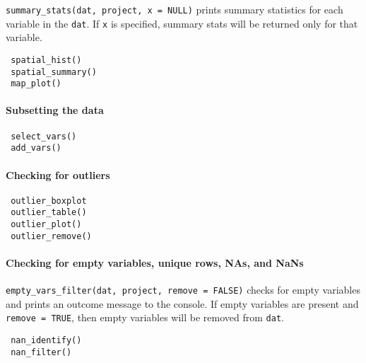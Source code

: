 \documentclass[
]{article}
\begin{document}
\texttt{summary\_stats(dat,\ project,\ x\ =\ NULL)} prints summary statistics for each variable in the \texttt{dat}. If \texttt{x} is specified, summary stats will be returned only for that variable.

\begin{verbatim}
 spatial_hist()    
 spatial_summary()  
 map_plot()         
\end{verbatim}

\hypertarget{subsetting-the-data-1}{%
\paragraph{Subsetting the data}\label{subsetting-the-data-1}}

\begin{verbatim}
 select_vars()       
 add_vars()         
\end{verbatim}

\hypertarget{checking-for-outliers-1}{%
\paragraph{Checking for outliers}\label{checking-for-outliers-1}}

\begin{verbatim}
 outlier_boxplot
 outlier_table()    
 outlier_plot()     
 outlier_remove()   
\end{verbatim}

\hypertarget{checking-for-empty-variables-unique-rows-nas-and-nans-1}{%
\paragraph{Checking for empty variables, unique rows, NAs, and NaNs}\label{checking-for-empty-variables-unique-rows-nas-and-nans-1}}

\texttt{empty\_vars\_filter(dat,\ project,\ remove\ =\ FALSE)} checks for empty variables and prints an outcome message to the console. If empty variables are present and \texttt{remove\ =\ TRUE}, then empty variables will be removed from \texttt{dat}.

\begin{verbatim}
 nan_identify()     
 nan_filter()  
 
\end{verbatim}
\end{document}
